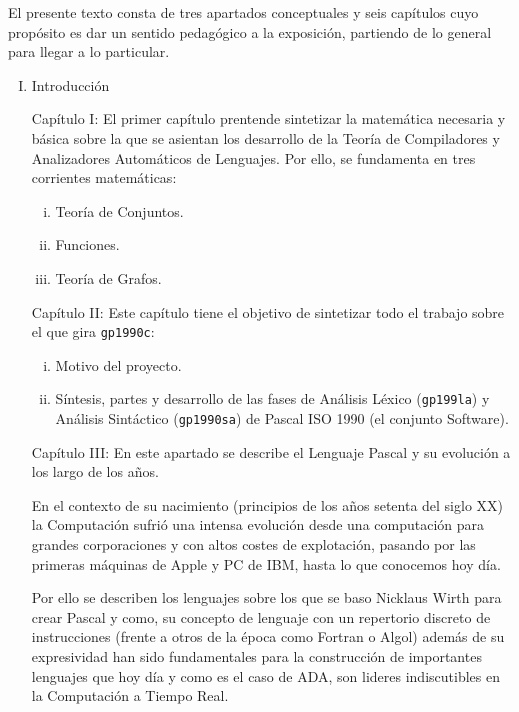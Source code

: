 
El presente texto consta de tres apartados conceptuales y seis capítulos cuyo propósito es dar un sentido pedagógico a la exposición, partiendo de lo general para llegar a lo particular.

\begin{enumerate}[I.]
\item Introducción
{

Capítulo I: El primer capítulo prentende sintetizar la 
matemática necesaria y básica sobre la que se asientan los desarrollo de la 
Teoría de Compiladores y Analizadores Automáticos de Lenguajes. Por ello, se 
fundamenta en tres corrientes matemáticas:

\begin{enumerate}[i.]
\item Teoría de Conjuntos. 
 
\item Funciones.

\item Teoría de Grafos.
\end{enumerate}

Capítulo II: Este capítulo tiene el objetivo de sintetizar todo el trabajo sobre 
el que gira \texttt{gp1990c}:

\begin{enumerate}[i.]

\item Motivo del proyecto.

\item Síntesis, partes y desarrollo de las fases de Análisis Léxico (\texttt{gp199la}) y 
Análisis Sintáctico (\texttt{gp1990sa}) de Pascal ISO 1990 (el conjunto Software).

\end{enumerate}

Capítulo III: En este apartado se describe el Lenguaje Pascal y su evolución a los 
largo de los años. 

En el contexto de su nacimiento (principios de los años setenta del siglo XX) 
la Computación sufrió una intensa evolución desde una computación para grandes 
corporaciones y con altos costes de explotación, pasando por las primeras máquinas de Apple y PC de IBM, hasta lo que conocemos hoy día.

Por ello se describen los lenguajes sobre los que se baso Nicklaus Wirth para crear Pascal y como, su concepto de lenguaje con un 
repertorio discreto de instrucciones (frente a otros de la época como Fortran o 
Algol) además de su expresividad han sido fundamentales para la construcción de 
importantes lenguajes que hoy día y como es el caso de ADA, son lideres 
indiscutibles en la Computación a Tiempo Real.

}
\end{enumerate}
